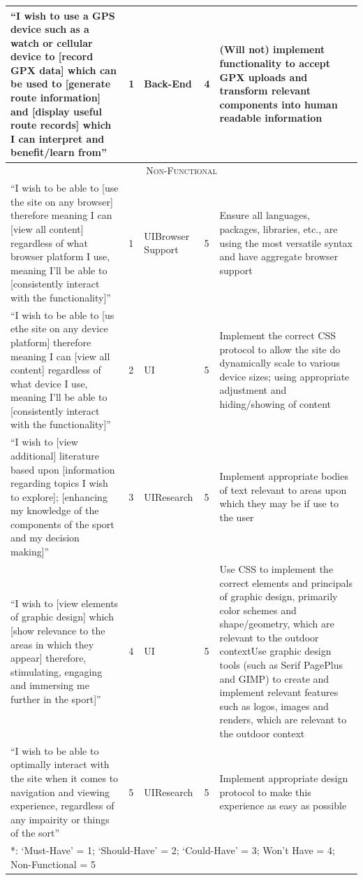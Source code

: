 \documentclass[11pt, english]{article}
\begin{document}
\begin{center}
\begin{longtable}{p{4cm}lp{1.5cm}lp{4cm}}
			\hline
			``I wish to use a GPS device such as a watch or cellular device to [record GPX data] which can be used to [generate route information] and [display useful route records] which I can interpret and benefit/learn from'' & 1 & Back-End & 4 & (Will not) implement functionality to accept GPX uploads and transform relevant components into human readable information\\
			\hline
			\multicolumn{5}{c}{\textsc{Non-Functional}}\\
			\hline
			``I wish to be able to [use the site on any browser] therefore meaning I can [view all content] regardless of what browser platform I use, meaning I'll be able to [consistently interact with the functionality]'' & 1 & UI\newline Browser Support & 5 & Ensure all languages, packages, libraries, etc., are using the most versatile syntax and have aggregate browser support\\
			``I wish to be able to [us ethe site on any device platform] therefore meaning I can [view all content] regardless of what device I use, meaning I'll be able to [consistently interact with the functionality]'' & 2 & UI & 5 & Implement the correct CSS protocol to allow the site do dynamically scale to various device sizes; using appropriate adjustment and hiding/showing of content\\
			``I wish to [view additional] literature based upon [information regarding topics I wish to explore]; [enhancing my knowledge of the components of the sport and my decision making]'' & 3 & UI\newline Research & 5 & Implement appropriate bodies of text relevant to areas upon which they may be if use to the user\\
			``I wish to [view elements of graphic design] which [show relevance to the areas in which they appear] therefore, stimulating, engaging and immersing me further in the sport]'' & 4 & UI & 5 & Use CSS to implement the correct elements and principals of graphic design, primarily color schemes and shape/geometry, which are relevant to the outdoor context\newline Use graphic design tools (such as Serif PagePlus and GIMP) to create and implement relevant features such as logos, images and renders, which are relevant to the outdoor context\\
			``I wish to be able to optimally interact with the site when it comes to navigation and viewing experience, regardless of any impairity or things of the sort'' & 5 & UI\newline Research & 5 & Implement appropriate design protocol to make this experience as easy as possible\\
			\hline
			\hline
			\multicolumn{5}{l}{*: `Must-Have' = 1; `Should-Have' = 2; `Could-Have' = 3; Won't Have = 4; Non-Functional = 5}\\
			\hline
		\end{longtable}
		\end{center}
\end{document}
